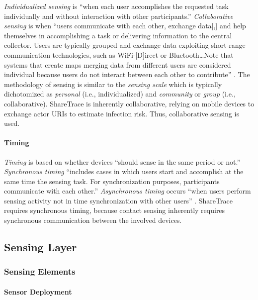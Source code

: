 \emph{Individualized sensing} is ``when each user accomplishes the requested task individually and without interaction with other participants.'' \emph{Collaborative sensing} is when ``users communicate with each other, exchange data[,] and help themselves in accomplishing a task or delivering information to the central collector. Users are typically grouped and exchange data exploiting short-range communication technologies, such as WiFi-[D]irect or Bluetooth{\ldots}Note that systems that create maps merging data from different users are considered individual because users do not interact between each other to contribute'' \cite{Capponi2019}. The methodology of sensing is similar to the \emph{sensing scale} which is typically dichotomized as \emph{personal} \cite{Lane2010, Ganti2011} (i.e., individualized) and \emph{community} \cite{Ganti2011} or \emph{group} \cite{Lane2010} (i.e., collaborative). ShareTrace is inherently collaborative, relying on mobile devices to exchange actor URIs to estimate infection risk. Thus, collaborative sensing is used.

\paragraph{Timing}

\emph{Timing} is based on whether devices ``should sense in the same period or not.'' \emph{Synchronous timing} ``includes cases in which users start and accomplish at the same time the sensing task. For synchronization purposes, participants communicate with each other.'' \emph{Asynchronous timing} occurs ``when users perform sensing activity not in time synchronization with other users'' \cite{Capponi2019}. ShareTrace requires synchronous timing, because contact sensing inherently requires synchronous communication between the involved devices.

\subsection{Sensing Layer}

\subsubsection{Sensing Elements}

\paragraph{Sensor Deployment}

